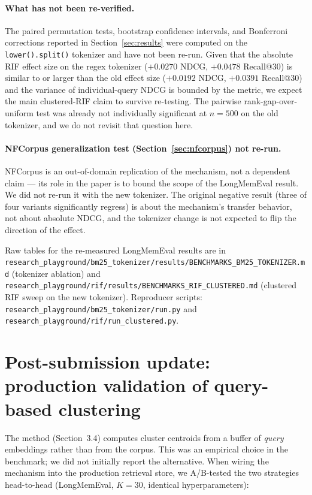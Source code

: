 \documentclass[11pt,a4paper]{article}
\begin{document}
\paragraph{What has not been re-verified.} The paired permutation tests, bootstrap confidence intervals, and Bonferroni corrections reported in Section~\ref{sec:results} were computed on the \texttt{lower().split()} tokenizer and have not been re-run. Given that the absolute RIF effect size on the regex tokenizer ($+0.0270$ NDCG, $+0.0478$ Recall@30) is similar to or larger than the old effect size ($+0.0192$ NDCG, $+0.0391$ Recall@30) and the variance of individual-query NDCG is bounded by the metric, we expect the main clustered-RIF claim to survive re-testing. The pairwise rank-gap-over-uniform test was already not individually significant at $n=500$ on the old tokenizer, and we do not revisit that question here.

\paragraph{NFCorpus generalization test (Section~\ref{sec:nfcorpus}) not re-run.} NFCorpus is an out-of-domain replication of the mechanism, not a dependent claim — its role in the paper is to bound the scope of the LongMemEval result. We did not re-run it with the new tokenizer. The original negative result (three of four variants significantly regress) is about the mechanism's transfer behavior, not about absolute NDCG, and the tokenizer change is not expected to flip the direction of the effect.

Raw tables for the re-measured LongMemEval results are in \texttt{research\_playground/bm25\_tokenizer/results/BENCHMARKS\_BM25\_TOKENIZER.md} (tokenizer ablation) and \texttt{research\_playground/rif/results/BENCHMARKS\_RIF\_CLUSTERED.md} (clustered RIF sweep on the new tokenizer). Reproducer scripts: \texttt{research\_playground/bm25\_tokenizer/run.py} and \texttt{research\_playground/rif/run\_clustered.py}.

\section*{Post-submission update: production validation of query-based clustering}
\label{sec:post-update-clustering}

The method (Section~3.4) computes cluster centroids from a buffer of \emph{query} embeddings rather than from the corpus. This was an empirical choice in the benchmark; we did not initially report the alternative. When wiring the mechanism into the production retrieval store, we A/B-tested the two strategies head-to-head (LongMemEval, $K=30$, identical hyperparameters):
\end{document}
